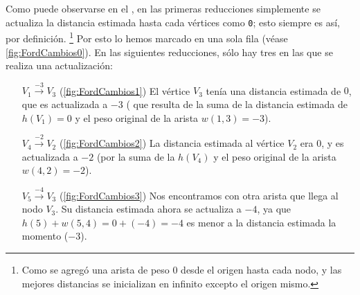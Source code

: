 \documentclass[../tp2_grupo404.tex]{subfiles}
\begin{document}
Como puede observarse en el , en las primeras
reducciones simplemente se actualiza la distancia
estimada hasta cada vértices como \texttt{0};
esto siempre es así, por definición.
\footnote{Como se agregó una arista de peso 0 desde
el origen hasta cada nodo, y las mejores distancias se inicializan
en infinito excepto el origen mismo.}
Por esto lo hemos marcado en una sola fila (véase \cref{fig:FordCambios0}).
En las siguientes reducciones, sólo hay tres en las que se realiza una actualización:
\begin{enumerate}
    \item[$V_1\overset{-3}{\rightarrow} V_3$] (\cref{fig:FordCambios1}) El vértice $V_3$
        tenía una distancia estimada de $0$, que es actualizada a $-3$
        ( que resulta de la suma de la distancia estimada de $h(V_1)=0$
        y el peso original de la arista $w(1,3)=-3$).
    \item[$V_4\overset{-2}{\rightarrow} V_2$] (\cref{fig:FordCambios2}) La distancia estimada al vértice $V_2$
        era $0$, y es actualizada a $-2$ (por la suma de la $h(V_4)$ y el peso
        original de la arista $w(4,2)=-2$).
    \item[$V_5\overset{-4}{\rightarrow} V_3$] (\cref{fig:FordCambios3}) Nos encontramos con otra arista que
        llega al nodo $V_3$. Su distancia estimada ahora se actualiza a $-4$,
        ya que $h(5)+w(5,4)=0+(-4)=-4$ es menor a la distancia estimada la momento ($-3$).
\end{enumerate}
\end{document}
